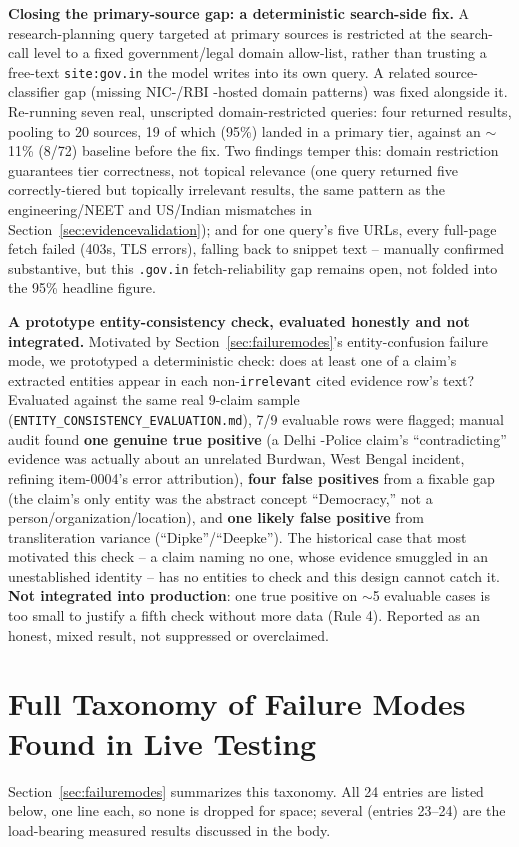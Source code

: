 \documentclass[conference]{IEEEtran}
\begin{document}
\textbf{Closing the primary-source gap: a deterministic search-side fix.}
\label{sec:primarysourcefix}
A research-planning query targeted at primary sources is restricted at
the search-call level to a fixed government/legal domain allow-list,
rather than trusting a free-text \texttt{site:gov.in} the model writes
into its own query. A related source-classifier gap (missing NIC-/RBI
-hosted domain patterns) was fixed alongside it. Re-running seven real,
unscripted domain-restricted queries: four returned results, pooling to
20 sources, 19 of which (95\%) landed in a primary tier, against an
$\sim$11\% (8/72) baseline before the fix. Two findings temper this:
domain restriction guarantees tier correctness, not topical relevance
(one query returned five correctly-tiered but topically irrelevant
results, the same pattern as the engineering/NEET and US/Indian
mismatches in Section~\ref{sec:evidencevalidation}); and for one query's
five URLs, every full-page fetch failed (403s, TLS errors), falling back
to snippet text -- manually confirmed substantive, but this
\texttt{.gov.in} fetch-reliability gap remains open, not folded into the
95\% headline figure.

\textbf{A prototype entity-consistency check, evaluated honestly and not
integrated.}
\label{sec:entityconsistency}
Motivated by Section~\ref{sec:failuremodes}'s entity-confusion failure
mode, we prototyped a deterministic check: does at least one of a
claim's extracted entities appear in each non-\texttt{irrelevant} cited
evidence row's text? Evaluated against the same real 9-claim sample
(\texttt{ENTITY\_CONSISTENCY\_EVALUATION.md}), 7/9 evaluable rows were
flagged; manual audit found \textbf{one genuine true positive} (a Delhi
-Police claim's ``contradicting'' evidence was actually about an
unrelated Burdwan, West Bengal incident, refining item-0004's error
attribution), \textbf{four false positives} from a fixable gap (the
claim's only entity was the abstract concept ``Democracy,'' not a
person/organization/location), and \textbf{one likely false positive}
from transliteration variance (``Dipke''/``Deepke''). The historical
case that most motivated this check -- a claim naming no one, whose
evidence smuggled in an unestablished identity -- has no entities to
check and this design cannot catch it. \textbf{Not integrated into
production}: one true positive on $\sim$5 evaluable cases is too small
to justify a fifth check without more data (Rule 4). Reported as an
honest, mixed result, not suppressed or overclaimed.

\section{Full Taxonomy of Failure Modes Found in Live Testing}
\label{sec:appendixtaxonomy}
Section~\ref{sec:failuremodes} summarizes this taxonomy. All 24 entries
are listed below, one line each, so none is dropped for space; several
(entries 23--24) are the load-bearing measured results discussed in the
body.
\end{document}
